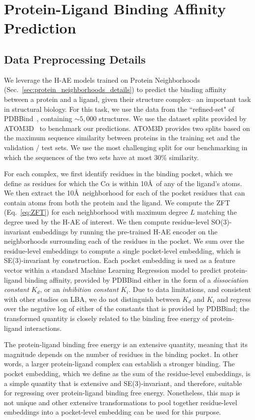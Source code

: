 \section{Protein-Ligand Binding Affinity Prediction}
\label{sec:lba_details}
\subsection{Data Preprocessing Details}
We leverage the H-AE models trained on Protein Neighborhoods
(Sec.~\ref{sec:protein_neighborhoods_details}) to predict the binding affinity between a protein
and a ligand, given their  structure complex-- an important task in structural biology. For this
task, we use the data from the ``refined-set" of PDBBind~\cite{su_comparative_2019}, containing
$\sim 5,000$ structures. We use the dataset splits provided by ATOM3D~\cite{townshend_atom3d_2021}
to benchmark our predictions. ATOM3D provides two splits based on the maximum sequence similarity
between proteins in the training set and the validation / test sets. We use the most challenging
split for our benchmarking in which the sequences of the two sets have at most 30\% similarity.

For each complex, we first identify residues in the binding pocket, which we define as residues for
which the C$\alpha$ is within 10\AA\, of any of the ligand's atoms. We then extract the 10\AA\,
neighborhood for each of the pocket residues that can contain atoms from both the protein and the
ligand. We compute the ZFT (Eq.~\ref{eq:ZFT}) for each neighborhood with maximum degree $L$
matching the degree used by the H-AE of interest. We then compute residue-level SO(3)-invariant
embeddings by running the pre-trained H-AE encoder on the neighborhoods surrounding each of the
residues in the pocket. We sum over the residue-level embeddings to compute a single pocket-level
embedding, which is SE(3)-invariant by construction. Each pocket embedding is used as a feature
vector within a standard Machine Learning Regression model to predict protein-ligand binding
affinity, provided by PDBBind either in the form of a \textit{dissociation constant} $K_d$, or an
\textit{inhibition constant} $K_i$. Due to data limitations, and consistent with other studies on
LBA, we do not distinguish between $K_d$ and $K_i$ and regress over  the negative log of either of
the constants that is provided by PDBBind; the transformed quantity is closely related to the
binding free energy of protein-ligand interactions. 

The protein-ligand binding free energy is an extensive quantity, meaning that its magnitude depends
on the number of residues in the binding pocket. In other words, a larger protein-ligand complex
can establish a stronger binding. The pocket embedding, which we define as the sum of the
residue-level embeddings, is a simple quantity that is extensive and SE(3)-invariant, and
therefore, suitable for regressing over protein-ligand binding free energy. Nonetheless, this map
is not unique and other extensive transformations to pool together residue-level embeddings into a
pocket-level embedding can be used for this purpose.

